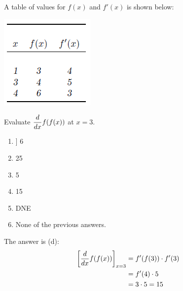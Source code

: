 \documentclass[nooutcomes]{ximera}
\begin{document}
\begin{problem}
 A table of values for $f(x)$ and $f'(x)$ is shown below:

\begin{image}
	\includegraphics{figure1.png}
\end{image}

  Evaluate $\displaystyle\frac{d}{dx} f(f(x))$ at $x = 3$.
  \begin{enumerate}
    \item] 6
    \item 25
    \item 5
    \item 15
    \item DNE
    \item None of the previous answers.
  \end{enumerate}
  \begin{freeResponse}
    The answer is (d):
    \begin{align*}
      \bigg[ \frac{d}{dx} f(f(x)) \bigg]_{x = 3} &= f'(f(3)) \cdot f'(3) \\
      &= f'(4)\cdot 5 \\
      &= 3 \cdot 5 = 15
    \end{align*}
  \end{freeResponse}
	
\end{problem}
\end{document}

